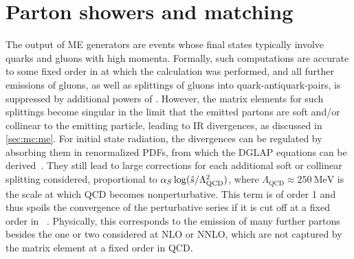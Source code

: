 \section{Parton showers and matching}
\label{sec:mc:showering}


The output of ME generators are events whose final states typically involve quarks and gluons with high momenta. Formally, such computations are accurate to some fixed order in \alphas at which the calculation was performed, and all further emissions of gluons, as well as splittings of gluons into quark-antiquark-pairs, is suppressed by additional powers of \alphas. 
However, the matrix elements for such splittings become singular in the limit that the emitted partons are soft and/or collinear to the emitting particle, leading to IR divergences, as discussed in \cref{sec:mc:me}. For initial state radiation, the divergences can be regulated by absorbing them in renormalized PDFs, from which the DGLAP equations can be derived~\cite{Skands:2012ts,Schwartz:2014sze}. They still lead to large corrections for each additional soft or collinear splitting considered, 
proportional to $\alpha_S \log( \hat{s} / \Lambda_{\mathrm{QCD}}^2)$, where $\Lambda_{\mathrm{QCD}} \approx \SI{250}{\MeV}$ is the scale at which QCD becomes nonperturbative. This term is of order 1 and thus spoils the convergence of the perturbative series if it is cut off at a fixed order in \alphas~\cite{Peskin:1995ev,Skands:2012ts}.
Physically, this corresponds to the emission of many further partons besides the one or two considered at NLO or NNLO, which are not captured by the matrix element at a fixed order in QCD.

